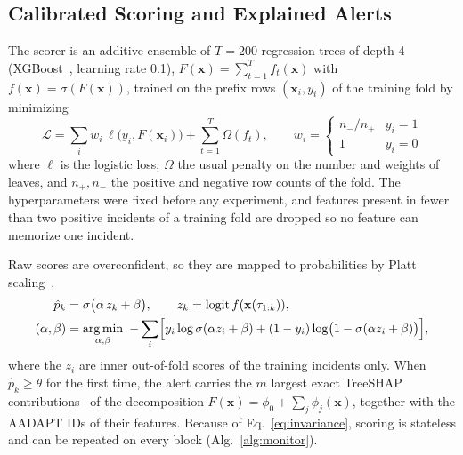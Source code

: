 \documentclass[runningheads]{llncs}
\newcommand{\1}{\mathbb{1}}
\DeclareMathOperator{\logit}{logit}
\DeclareMathOperator*{\argmin}{arg\,min}
\begin{document}
\subsection{Calibrated Scoring and Explained Alerts}
\label{sec:scoring}

The scorer is an additive ensemble of $T=200$ regression trees of depth 4 (XGBoost~\cite{chen2016xgboost}, learning rate 0.1), $F(\mathbf{x})=\sum_{t=1}^{T}f_t(\mathbf{x})$ with $f(\mathbf{x})=\sigma(F(\mathbf{x}))$, trained on the prefix rows $(\mathbf{x}_i,y_i)$ of the training fold by minimizing
\begin{equation}
\mathcal{L}=\sum_i w_i\,\ell\bigl(y_i,F(\mathbf{x}_i)\bigr)+\sum_{t=1}^{T}\Omega(f_t),\qquad w_i=\begin{cases}n_-/n_+ & y_i=1\\ 1 & y_i=0\end{cases}
\label{eq:xgb}
\end{equation}
where $\ell$ is the logistic loss, $\Omega$ the usual penalty on the number and weights of leaves, and $n_+,n_-$ the positive and negative row counts of the fold.
The hyperparameters were fixed before any experiment, and features present in fewer than two positive incidents of a training fold are dropped so no feature can memorize one incident.

Raw scores are overconfident, so they are mapped to probabilities by Platt scaling~\cite{niculescu2005calibration},
\begin{equation}
\begin{aligned}
\hat p_k&=\sigma\bigl(\alpha\,z_k+\beta\bigr),\qquad z_k=\logit f(\mathbf{x}(\tau_{1:k})),\\
(\alpha,\beta)&=\argmin_{\alpha,\beta}\ -\sum_i\Bigl[y_i\log\sigma(\alpha z_i+\beta)+(1-y_i)\log\bigl(1-\sigma(\alpha z_i+\beta)\bigr)\Bigr],
\end{aligned}
\label{eq:platt}
\end{equation}
where the $z_i$ are inner out-of-fold scores of the training incidents only.
When $\hat p_k\ge\theta$ for the first time, the alert carries the $m$ largest exact TreeSHAP contributions~\cite{lundberg2020treeshap} of the decomposition $F(\mathbf{x})=\phi_0+\sum_{j}\phi_j(\mathbf{x})$, together with the AADAPT IDs of their features.
Because of Eq.~\eqref{eq:invariance}, scoring is stateless and can be repeated on every block (Alg.~\ref{alg:monitor}).
\end{document}
